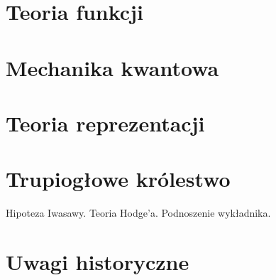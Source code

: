 \chapter{Teoria funkcji}

\chapter{Mechanika kwantowa}
	

\chapter{Teoria reprezentacji}

\chapter{Trupiogłowe królestwo}
	Hipoteza Iwasawy.
	Teoria Hodge'a.
	Podnoszenie wykładnika.

\chapter{Uwagi historyczne}
	